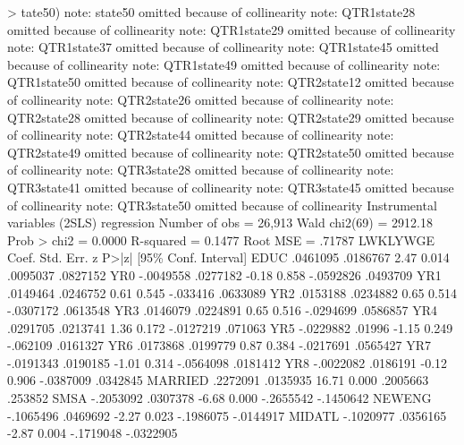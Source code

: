 > tate50)
note: state50 omitted because of collinearity
note: QTR1state28 omitted because of collinearity
note: QTR1state29 omitted because of collinearity
note: QTR1state37 omitted because of collinearity
note: QTR1state45 omitted because of collinearity
note: QTR1state49 omitted because of collinearity
note: QTR1state50 omitted because of collinearity
note: QTR2state12 omitted because of collinearity
note: QTR2state26 omitted because of collinearity
note: QTR2state28 omitted because of collinearity
note: QTR2state29 omitted because of collinearity
note: QTR2state44 omitted because of collinearity
note: QTR2state49 omitted because of collinearity
note: QTR2state50 omitted because of collinearity
note: QTR3state28 omitted because of collinearity
note: QTR3state41 omitted because of collinearity
note: QTR3state45 omitted because of collinearity
note: QTR3state50 omitted because of collinearity
{\smallskip}
Instrumental variables (2SLS) regression          Number of obs   =     26,913
                                                  Wald chi2(69)   =    2912.18
                                                  Prob > chi2     =     0.0000
                                                  R-squared       =     0.1477
                                                  Root MSE        =     .71787
{\smallskip}
    LWKLYWGE {\VBAR}      Coef.   Std. Err.      z    P>|z|     [95\% Conf. Interval]
        EDUC {\VBAR}   .0461095   .0186767     2.47   0.014     .0095037    .0827152
         YR0 {\VBAR}  -.0049558   .0277182    -0.18   0.858    -.0592826    .0493709
         YR1 {\VBAR}   .0149464   .0246752     0.61   0.545     -.033416    .0633089
         YR2 {\VBAR}   .0153188   .0234882     0.65   0.514    -.0307172    .0613548
         YR3 {\VBAR}   .0146079   .0224891     0.65   0.516    -.0294699    .0586857
         YR4 {\VBAR}   .0291705   .0213741     1.36   0.172    -.0127219     .071063
         YR5 {\VBAR}  -.0229882     .01996    -1.15   0.249     -.062109    .0161327
         YR6 {\VBAR}   .0173868   .0199779     0.87   0.384    -.0217691    .0565427
         YR7 {\VBAR}  -.0191343   .0190185    -1.01   0.314    -.0564098    .0181412
         YR8 {\VBAR}  -.0022082   .0186191    -0.12   0.906    -.0387009    .0342845
     MARRIED {\VBAR}   .2272091   .0135935    16.71   0.000     .2005663     .253852
        SMSA {\VBAR}  -.2053092   .0307378    -6.68   0.000    -.2655542   -.1450642
      NEWENG {\VBAR}  -.1065496   .0469692    -2.27   0.023    -.1986075   -.0144917
      MIDATL {\VBAR}  -.1020977   .0356165    -2.87   0.004    -.1719048   -.0322905
